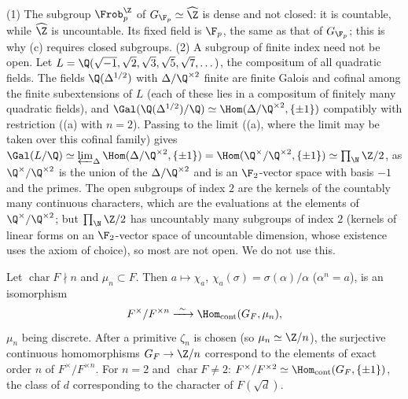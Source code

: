 \begin{example}\label{ex:galois:warnings}
(1) The subgroup $\Frob_p^{\Z}$ of $G_{\F_p}\simeq\widehat\Z$ is dense and not closed: it is countable, while $\widehat\Z$ is uncountable. Its fixed field is $\F_p$, the same as
that of $G_{\F_p}$; this is why (c) requires closed subgroups.
(2) A subgroup of finite index need not be open. Let $L=\Q(\sqrt{-1},\sqrt2,\sqrt3,\sqrt5,\sqrt7,\dots)$, the compositum of all quadratic fields. The fields $\Q(\Delta^{1/2})$ with
$\Delta/\Q^{\times2}$ finite are finite Galois and cofinal among the finite subextensions of $L$ (each of these lies in a compositum of finitely many quadratic fields), and
$\Gal(\Q(\Delta^{1/2})/\Q)\simeq\Hom(\Delta/\Q^{\times2},\{\pm1\})$ compatibly with restriction ((a) with $n=2$). Passing to the limit
((a), where the limit may be taken over this cofinal family) gives $\Gal(L/\Q)\simeq\varprojlim_\Delta\Hom(\Delta/\Q^{\times2},\{\pm1\})=
\Hom(\Q^\times/\Q^{\times2},\{\pm1\})\simeq\prod_{\N}\Z/2$, as $\Q^\times/\Q^{\times2}$ is the union of the $\Delta/\Q^{\times2}$ and is an $\F_2$-vector space with basis
$-1$ and the primes. The open subgroups of index $2$ are the kernels of the countably many continuous characters, which are the
evaluations at the elements of $\Q^\times/\Q^{\times2}$; but $\prod_\N\Z/2$ has uncountably many subgroups of index $2$ (kernels of linear forms on an
$\F_2$-vector space of uncountable dimension, whose existence uses the axiom of choice), so most are not open. We do not use this.
\end{example}

\begin{corollary}\label{cor:galois:kummer-absolute}
Let $\operatorname{char}F\nmid n$ and $\mu_n\subset F$. Then $a\mapsto\chi_a$, $\chi_a(\sigma)=\sigma(\alpha)/\alpha$ ($\alpha^n=a$), is an isomorphism
\[
F^\times/F^{\times n}\xrightarrow{\ \sim\ }\Hom_{\mathrm{cont}}(G_F,\mu_n),
\]
$\mu_n$ being discrete. After a primitive $\zeta_n$ is chosen (so $\mu_n\simeq\Z/n$), the surjective continuous homomorphisms $G_F\to\Z/n$ correspond to the elements of
exact order $n$ of $F^\times/F^{\times n}$. For $n=2$ and $\operatorname{char}F\ne2$: $F^\times/F^{\times2}\simeq\Hom_{\mathrm{cont}}(G_F,\{\pm1\})$, the class of $d$
corresponding to the character of $F(\sqrt d)$.
\end{corollary}

